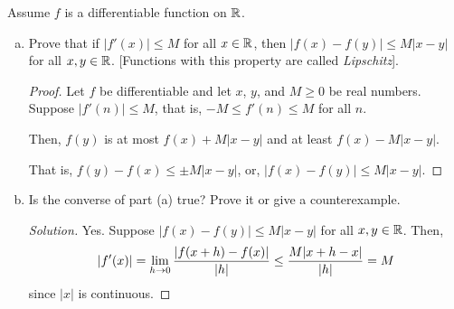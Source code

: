 \documentclass{agony}
\begin{document}
\question Assume $f$ is a differentiable function on $\mathbb{R}$.
\begin{enumerate}[(a)]
  \item Prove that if $|f'(x)| \leq M$ for all $x \in \mathbb{R}$,
        then $|f(x) - f(y)| \leq M|x-y|$ for all $x,y\in\mathbb{R}$.
          [Functions with this property are called \emph{Lipschitz}].
        \begin{proof}
          Let $f$ be differentiable and let $x$, $y$, and $M \geq 0$ be real numbers.
          Suppose $|f'(n)| \leq M$, that is, $-M \leq f'(n) \leq M$ for all $n$.

          Then, $f(y)$ is at most $f(x) + M|x-y|$ and at least $f(x) - M|x-y|$.

          That is, $f(y) - f(x) \leq \pm M|x-y|$, or, $|f(x)-f(y)| \leq M|x-y|$.
        \end{proof}
  \item Is the converse of part (a) true? Prove it or give a counterexample.
        \begin{proof}[Solution]
          Yes. Suppose $|f(x) - f(y)| \leq M|x-y|$ for all $x,y\in\mathbb{R}$. Then,
          \begin{align*}
            |f'(x)| = \lim_{h\to0}\frac{\abs{f(x+h)-f(x)}}{|h|} \leq \frac{M|x+h-x|}{|h|} = M
          \end{align*}
          since $|x|$ is continuous.
        \end{proof}
\end{enumerate}
\end{document}
